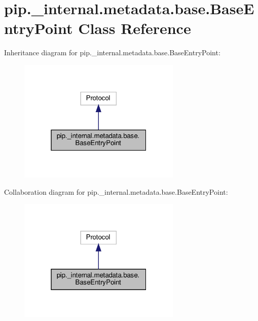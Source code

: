 \hypertarget{classpip_1_1__internal_1_1metadata_1_1base_1_1BaseEntryPoint}{}\section{pip.\+\_\+internal.\+metadata.\+base.\+Base\+Entry\+Point Class Reference}
\label{classpip_1_1__internal_1_1metadata_1_1base_1_1BaseEntryPoint}


Inheritance diagram for pip.\+\_\+internal.\+metadata.\+base.\+Base\+Entry\+Point\+:
\nopagebreak
\begin{figure}[H]
\begin{center}
\leavevmode
\includegraphics[width=220pt]{classpip_1_1__internal_1_1metadata_1_1base_1_1BaseEntryPoint__inherit__graph}
\end{center}
\end{figure}


Collaboration diagram for pip.\+\_\+internal.\+metadata.\+base.\+Base\+Entry\+Point\+:
\nopagebreak
\begin{figure}[H]
\begin{center}
\leavevmode
\includegraphics[width=220pt]{classpip_1_1__internal_1_1metadata_1_1base_1_1BaseEntryPoint__coll__graph}
\end{center}
\end{figure}
